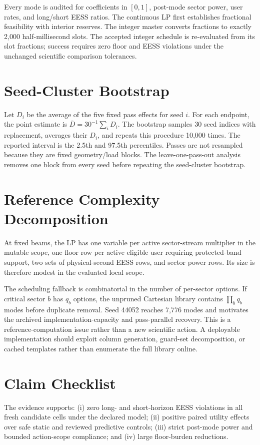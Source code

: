 \documentclass[journal]{IEEEtran}
\begin{document}
Every mode is audited for coefficients in $[0,1]$, post-mode sector power, user rates, and long/short EESS ratios. The continuous LP first establishes fractional feasibility with interior reserves. The integer master converts fractions to exactly 2,000 half-millisecond slots. The accepted integer schedule is re-evaluated from its slot fractions; success requires zero floor and EESS violations under the unchanged scientific comparison tolerances.

\section{Seed-Cluster Bootstrap}
Let $D_i$ be the average of the five fixed pass effects for seed $i$. For each endpoint, the point estimate is $\bar D=30^{-1}\sum_iD_i$. The bootstrap samples 30 seed indices with replacement, averages their $D_i$, and repeats this procedure 10,000 times. The reported interval is the 2.5th and 97.5th percentiles. Passes are not resampled because they are fixed geometry/load blocks. The leave-one-pass-out analysis removes one block from every seed before repeating the seed-cluster bootstrap.


\section{Reference Complexity Decomposition}
At fixed beams, the LP has one variable per active sector-stream multiplier in the mutable scope, one floor row per active eligible user requiring protected-band support, two sets of physical-second EESS rows, and sector power rows. Its size is therefore modest in the evaluated local scope.

The scheduling fallback is combinatorial in the number of per-sector options. If critical sector $b$ has $q_b$ options, the unpruned Cartesian library contains $\prod_b q_b$ modes before duplicate removal. Seed 44052 reaches 7,776 modes and motivates the archived implementation-capacity and pass-parallel recovery. This is a reference-computation issue rather than a new scientific action. A deployable implementation should exploit column generation, guard-set decomposition, or cached templates rather than enumerate the full library online.

\section{Claim Checklist}
The evidence supports: (i) zero long- and short-horizon EESS violations in all fresh candidate cells under the declared model; (ii) positive paired utility effects over safe static and reviewed predictive controls; (iii) strict post-mode power and bounded action-scope compliance; and (iv) large floor-burden reductions.
\end{document}
